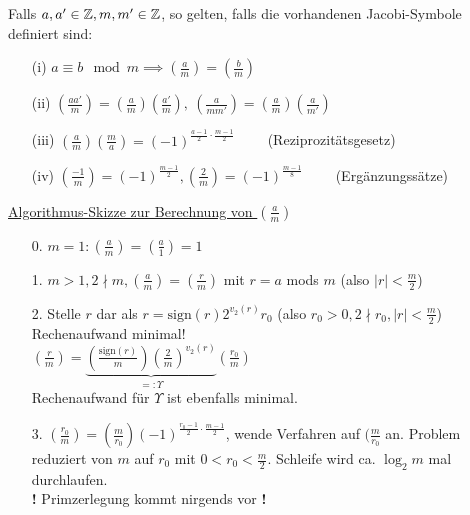 \documentclass[a4paper,DIV15,BCOR12mm]{article}
\begin{document}
\begin{satz}\label{satz:Jacobisymbol}
    Falls $a, a' \in \mathbb{Z}, m, m' \in \mathbb{Z}$, so gelten, falls die vorhandenen Jacobi-Symbole definiert sind:
    \begin{itemize}
        \item[(i)] $a \equiv b \mod m \implies \left(\frac{a}{m}\right) = \left(\frac{b}{m}\right)$
        \item[(ii)] $\left(\frac{aa'}{m}\right) =
        \left(\frac{a}{m}\right)\left(\frac{a'}{m}\right),\
                    \left(\frac{a}{mm'}\right) = \left(\frac{a}{m}\right)\left(\frac{a}{m'}\right)$
        \item[(iii)] $\left(\frac{a}{m}\right)\left(\frac{m}{a}\right) = (-1)^{\frac{a-1}{2} \cdot \frac{m-1}{2}}\qquad$ (Reziprozitätsgesetz)
        \item[(iv)] $\left(\frac{-1}{m}\right) = (-1)^{\frac{m-1}{2}}, \left(\frac{2}{m}\right) = (-1)^{\frac{m-1}{8}}\qquad$ (Ergänzungssätze)
    \end{itemize}
\end{satz}

\underline{Algorithmus-Skizze zur Berechnung von
$\left(\frac{a}{m}\right)$}
\begin{itemize}
    \item[0.] $m = 1: \left(\frac{a}{m}\right) = \left(\frac{a}{1}\right) = 1$
    \item[1.] $m > 1, 2 \nmid m, \left(\frac{a}{m}\right) = \left(\frac{r}{m}\right)$ mit
        $r = a$ mods $m$ (also $|r| < \frac{m}{2}$)
    \item[2.] Stelle $r$ dar als $r = \text{sign}(r)2^{v_2(r)}r_0$ (also $r_0 > 0, 2 \nmid r_0, |r| < \frac{m}{2}$)\\
        Rechenaufwand minimal!\\
        $\left(\frac{r}{m}\right) = \underbrace{\left(\frac{\text{sign}(r)}{m}\right)\left(\frac{2}{m}\right)^{v_2(r)}}_{=: \Upsilon}(\frac{r_0}{m})$\\
        Rechenaufwand für $\Upsilon$ ist ebenfalls minimal.
    \item[3.] $\left(\frac{r_0}{m}\right) = \left(\frac{m}{r_0}\right)(-1)^{\frac{r_0 - 1}{2} \cdot \frac{m-1}{2}}$,
     wende Verfahren auf $(\frac{m}{r_0}$ an. Problem reduziert von $m$ auf $r_0$ mit $0 < r_0 < \frac{m}{2}$.
     Schleife wird ca. $\log_2 m$ mal durchlaufen.\\
     \textbf{!} Primzerlegung kommt nirgends vor \textbf{!}
\end{itemize}
\end{document}
